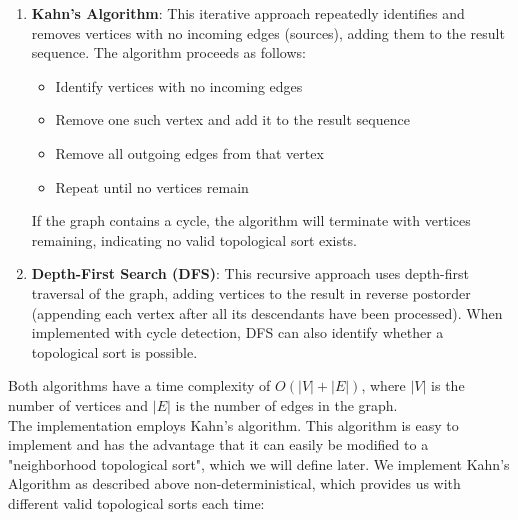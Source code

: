 \documentclass[%
thesis=student,%
coverpage=false,%
titlepage=false,%
headmarks=true, %
english,%
font=libertine, %
math=newpxtx, %
BCOR=5mm,%
coverBCOR=11mm%
]{tum-templates/book/tumbook}
\begin{document}
\begin{enumerate}
    \item \textbf{Kahn's Algorithm}: This iterative approach repeatedly identifies and removes vertices with no incoming edges (sources), adding them to the result sequence. The algorithm proceeds as follows:
    \begin{itemize}
        \item Identify vertices with no incoming edges
        \item Remove one such vertex and add it to the result sequence
        \item Remove all outgoing edges from that vertex
        \item Repeat until no vertices remain
    \end{itemize}
    If the graph contains a cycle, the algorithm will terminate with vertices remaining, indicating no valid topological sort exists.
    
    \item \textbf{Depth-First Search (DFS)}: This recursive approach uses depth-first traversal of the graph, adding vertices to the result in reverse postorder (appending each vertex after all its descendants have been processed). When implemented with cycle detection, DFS can also identify whether a topological sort is possible.
\end{enumerate}

Both algorithms have a time complexity of $O(|V| + |E|)$, where $|V|$ is the number of vertices and $|E|$ is the number of edges in the graph. \\
The implementation employs Kahn's algorithm. This algorithm is easy to implement and has the advantage that it can easily be modified to a "neighborhood topological sort", which we will define later. We implement Kahn's Algorithm as described above non-deterministical, which provides us with different valid topological sorts each time:
\end{document}
